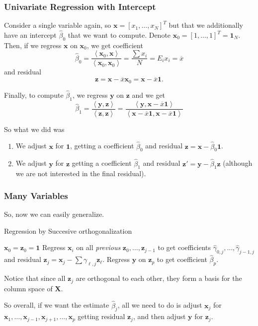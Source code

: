 \documentclass[11pt]{article}
\theoremstyle{definition}
\newcommand{\XX}{\mathbf{X}}
\newcommand{\xx}{\mathbf{x}}
\newcommand{\zz}{\mathbf{z}}
\newcommand{\yy}{\mathbf{y}}
\newcommand{\onevec}{\mathbf{1}}
\newcommand{\ip}[2]{\ensuremath{\left\langle#1, #2\right\rangle}}
\begin{document}
\subsubsection{Univariate Regression with Intercept}
Consider a single variable again, so $\xx=[x_1,\ldots,x_N]^T$ but that we
additionally have an intercept $\hat\beta_0$ that we want to compute. Denote
$\xx_0=[1,\ldots,1]^T=\onevec_N$. Then, if we regress $\xx$ on $\xx_0$, we get
coefficient
\[\hat\beta_0=\frac{\ip{\xx_0}\xx}{\ip{\xx_0}{\xx_0}}=\frac{\sum x_i}{N}=E_ix_i=\overline{x}\]
and residual
\[\zz=\xx-\overline{x}\xx_0=\xx-\overline{x}\onevec.\]

Finally, to compute $\hat\beta_1$, we regress $\yy$ on $\zz$ and we get
\[\hat\beta_1=\frac{\ip\yy\zz}{\ip\zz\zz}=\frac{\ip\yy{\xx-\overline{x}\onevec}}{\ip{\xx-\overline{x}\onevec}{\xx-\overline{x}\onevec}}\]

So what we did was
\begin{enumerate}
	\item We adjust $\xx$ for $\onevec$, getting a coefficient $\hat\beta_0$ and
	      residual $\zz=\xx-\hat\beta_0\onevec$.
	\item We adjust $\yy$ for $\zz$ getting a coefficient $\hat\beta_1$ and
	      residual $\zz'=\yy-\hat\beta_1\zz$ (although we are not interested in the
	      final residual).
\end{enumerate}

\subsubsection{Many Variables}
So, now we can easily generalize.
\begin{algorithm}
	\caption{Regression by Succesive orthogonalization}\label{alg:Gram-Schmidt}
	\begin{algorithmic}
		\State $\xx_0=\zz_0=\onevec$
		\State Regress $\xx_i$ on all \emph{previous} $\zz_0,\ldots,\zz_{j-1}$
		to get coefficients $\hat\gamma_{0,j},\ldots,\hat\gamma_{j-1,j}$ and
		residual $\zz_j=\xx_j-\sum \gamma_{\ell,j}\zz_\ell$.
		\EndFor
		\State Regress $\yy$ on $\zz_p$ to get coefficient $\hat\beta_p$.
	\end{algorithmic}
\end{algorithm}

Notice that since all $\zz_j$ are orthogonal to each other, they form a basis
for the column space of $\XX$.

So overall, if we want the estimate $\hat\beta_j$, all we need to do is adjust
$\xx_j$ for $\xx_1,\ldots,\xx_{j-1},\xx_{j+1},\ldots,\xx_p$ getting residual
$\zz_j$, and then adjust $\yy$ for $\zz_j$.
\end{document}
